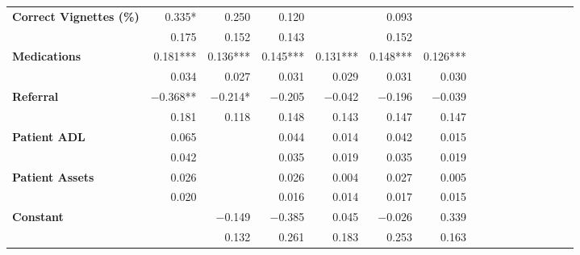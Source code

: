 \begin{tabular}{@{\extracolsep{5pt}}lrrrrrrrrrrrrrrr}
{\bf Correct Vignettes (\%)} & 0.335\phantom{)}*\phantom{**} & 0.250\phantom{\phantom{)}***} & 0.120\phantom{\phantom{)}***} & \phantom{***} & 0.093\phantom{\phantom{)}***} & \phantom{***} \\
{\bf } & 0.175\phantom{\phantom{)}***} & 0.152\phantom{\phantom{)}***} & 0.143\phantom{\phantom{)}***} & \phantom{***} & 0.152\phantom{\phantom{)}***} & \phantom{***} \\
{\bf Medications} & 0.181\phantom{)}*** & 0.136\phantom{)}*** & 0.145\phantom{)}*** & 0.131\phantom{)}*** & 0.148\phantom{)}*** & 0.126\phantom{)}*** \\
{\bf } & 0.034\phantom{\phantom{)}***} & 0.027\phantom{\phantom{)}***} & 0.031\phantom{\phantom{)}***} & 0.029\phantom{\phantom{)}***} & 0.031\phantom{\phantom{)}***} & 0.030\phantom{\phantom{)}***} \\
{\bf Referral} & $-$0.368\phantom{)}**\phantom{*} & $-$0.214\phantom{)}*\phantom{**} & $-$0.205\phantom{\phantom{)}***} & $-$0.042\phantom{\phantom{)}***} & $-$0.196\phantom{\phantom{)}***} & $-$0.039\phantom{\phantom{)}***} \\
{\bf } & 0.181\phantom{\phantom{)}***} & 0.118\phantom{\phantom{)}***} & 0.148\phantom{\phantom{)}***} & 0.143\phantom{\phantom{)}***} & 0.147\phantom{\phantom{)}***} & 0.147\phantom{\phantom{)}***} \\
{\bf Patient ADL} & 0.065\phantom{\phantom{)}***} & \phantom{***} & 0.044\phantom{\phantom{)}***} & 0.014\phantom{\phantom{)}***} & 0.042\phantom{\phantom{)}***} & 0.015\phantom{\phantom{)}***} \\
{\bf } & 0.042\phantom{\phantom{)}***} & \phantom{***} & 0.035\phantom{\phantom{)}***} & 0.019\phantom{\phantom{)}***} & 0.035\phantom{\phantom{)}***} & 0.019\phantom{\phantom{)}***} \\
{\bf Patient Assets} & 0.026\phantom{\phantom{)}***} & \phantom{***} & 0.026\phantom{\phantom{)}***} & 0.004\phantom{\phantom{)}***} & 0.027\phantom{\phantom{)}***} & 0.005\phantom{\phantom{)}***} \\
{\bf } & 0.020\phantom{\phantom{)}***} & \phantom{***} & 0.016\phantom{\phantom{)}***} & 0.014\phantom{\phantom{)}***} & 0.017\phantom{\phantom{)}***} & 0.015\phantom{\phantom{)}***} \\
{\bf Constant} & \phantom{***} & $-$0.149\phantom{\phantom{)}***} & $-$0.385\phantom{\phantom{)}***} & 0.045\phantom{\phantom{)}***} & $-$0.026\phantom{\phantom{)}***} & 0.339\phantom{\phantom{)}***} \\
{\bf } & \phantom{***} & 0.132\phantom{\phantom{)}***} & 0.261\phantom{\phantom{)}***} & 0.183\phantom{\phantom{)}***} & 0.253\phantom{\phantom{)}***} & 0.163\phantom{\phantom{)}***} \\

\end{tabular}
